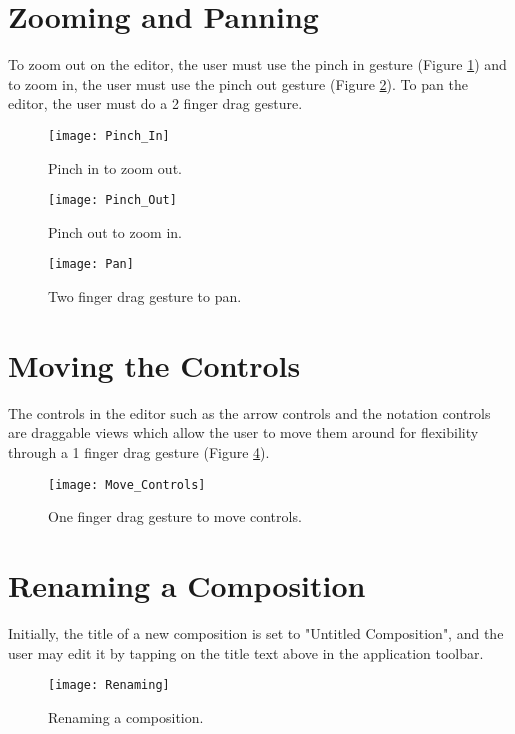 \section{Zooming and Panning}
To zoom out on the editor, the user must use the pinch in gesture (Figure \ref{fig:pinch-in}) and to zoom in, the user must use the pinch out gesture (Figure \ref{fig:pinch-out}). To pan the editor, the user must do a 2 finger drag gesture.

\begin{figure}[H]
  \centering
  \texttt{[image: Pinch\_In]}
    \caption{Pinch in to zoom out.}
    \label{fig:pinch-in}
\end{figure}

\begin{figure}[H]
  \centering
  \texttt{[image: Pinch\_Out]}
    \caption{Pinch out to zoom in.}
    \label{fig:pinch-out}
\end{figure}

\begin{figure}[H]
  \centering
  \texttt{[image: Pan]}
    \caption{Two finger drag gesture to pan.}
    \label{fig:pan}
\end{figure}

\section{Moving the Controls}
The controls in the editor such as the arrow controls and the notation controls are draggable views which allow the user to move them around for flexibility through a 1 finger drag gesture (Figure \ref{fig:move-controls}).

\begin{figure}[H]
  \centering
  \texttt{[image: Move\_Controls]}
    \caption{One finger drag gesture to move controls.}
    \label{fig:move-controls}
\end{figure}

\section{Renaming a Composition}
Initially, the title of a new composition is set to "Untitled Composition", and the user may edit it by tapping on the title text above in the application toolbar. 

\begin{figure}[H]
  \centering
  \texttt{[image: Renaming]}
    \caption{Renaming a composition.}
    \label{fig:renaming}
\end{figure}

